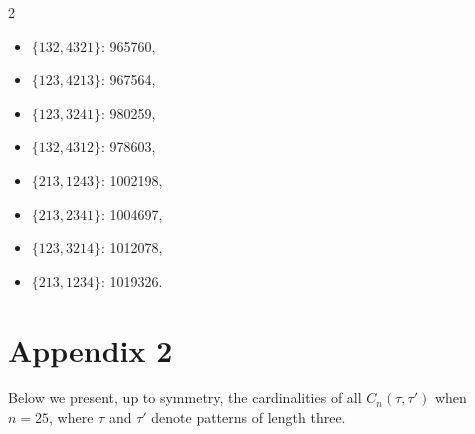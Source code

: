 \documentclass[11pt]{amsart}
\theoremstyle{plain}
\theoremstyle{definition}
\begin{document}
{\begin{multicols}{2}
\begin{itemize}
\item $\{132,4321\}$: 965760,
\item $\{123,4213\}$: 967564,
\item $\{123,3241\}$: 980259,
\item $\{132,4312\}$: 978603,
\item $\{213,1243\}$: 1002198,
\item $\{213,2341\}$: 1004697,
\item $\{123,3214\}$: 1012078,
\item $\{213,1234\}$: 1019326.
\end{itemize}
\end{multicols}}

\section{Appendix 2}

Below we present, up to symmetry, the cardinalities of all $C_n(\tau,\tau')$ when $n=25$, where $\tau$ and $\tau'$ denote patterns of length three.
\end{document}
